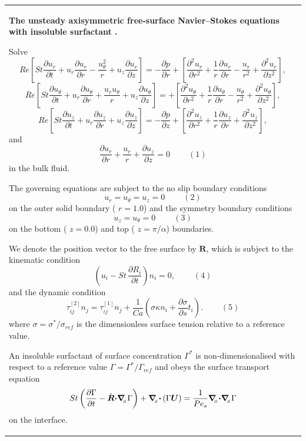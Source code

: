 \begin{center} \tabulinesep=1mm
\begin{longtabu} spread 0pt [c]{*{1}{|X[-1]}|}
\hline
\begin{center} {\bfseries  The unsteady axisymmetric free-\/surface Navier--Stokes equations with insoluble surfactant .} \end{center}  Solve \[ Re \left[ St \frac{\partial u_r}{\partial t} + u_r \frac{\partial u_r}{\partial r} - \frac{u_\theta^2}{r} + u_z \frac{\partial u_r}{\partial z} \right] = -\frac{\partial p}{\partial r} + \left[ \frac{\partial^2 u_r}{\partial r^2} + \frac{1}{r}\frac{\partial u_r}{\partial r} - \frac{u_r}{r^2} + \frac{\partial^2 u_r}{\partial z^2} \right], \] \[ Re \left[ St \frac{\partial u_\theta}{\partial t} + u_r \frac{\partial u_\theta}{\partial r} + \frac{u_r u_\theta}{r} + u_z \frac{\partial u_\theta}{\partial z} \right] = + \left[ \frac{\partial^2 u_\theta}{\partial r^2} + \frac{1}{r}\frac{\partial u_\theta}{\partial r} - \frac{u_\theta}{r^2} + \frac{\partial^2 u_\theta}{\partial z^2} \right], \] \[ Re \left[ St \frac{\partial u_z}{\partial t} + u_r \frac{\partial u_z}{\partial r} + u_z \frac{\partial u_z}{\partial z} \right] = -\frac{\partial p}{\partial z} + \left[ \frac{\partial^2 u_z}{\partial r^2} + \frac{1}{r}\frac{\partial u_z}{\partial r} + \frac{\partial^2 u_z}{\partial z^2} \right], \] and \[ \frac{\partial u_r}{\partial r} + \frac{u_r}{r} + \frac{\partial u_z}{\partial z} = 0 \ \ \ \ \ \ \ \ \ \ (1) \] in the bulk fluid.

The governing equations are subject to the no slip boundary conditions \[ u_r = u_\theta = u_z = 0 \ \ \ \ \ \ \ \ \ \ (2) \] on the outer solid boundary ( $ r = 1.0 $) and the symmetry boundary conditions \[ u_z = u_\theta = 0 \ \ \ \ \ \ \ \ \ \ (3) \] on the bottom ( $ z = 0.0 $) and top ( $ z = \pi / \alpha $) boundaries.

We denote the position vector to the free surface by $ \mathbf{R} $, which is subject to the kinematic condition \[ \left(u_i - St\, \frac{\partial R_i}{\partial t}\right) n_i = 0, \ \ \ \ \ \ \ \ \ \ (4) \] and the dynamic condition \[ \tau_{ij}^{[2]}n_j = \tau_{ij}^{[1]}n_j+\frac{1}{Ca}\left (\sigma \kappa n_i + \frac{\partial \sigma}{\partial s} t_{i} \right). \ \ \ \ \ \ \ \ \ \ (5) \] where $ \sigma = \sigma^{*} / \sigma_{ref} $ is the dimensionless surface tension relative to a reference value.

An insoluble surfactant of surface concentration $ \Gamma^{*}$ is non-\/dimensionalised with respect to a reference value $ \Gamma = \Gamma^{*}/\Gamma_{ref} $ and obeys the surface transport equation \[ St \left(\frac{\partial \Gamma}{\partial t} - \dot{\mbox{\boldmath$R$}} \mbox{\boldmath$\cdot$} \mbox{\boldmath$\nabla$}_{\!\!_{S}} \Gamma \right) + \mbox{\boldmath$\nabla$}_{\!\!_{S}} \mbox{\boldmath$\cdot$} \left(\Gamma \mbox{\boldmath$U$}\right) = \frac{1}{Pe_{s}} \mbox{\boldmath$\nabla$}_{\!\!_{S}}\mbox{\boldmath$\cdot$} \mbox{\boldmath$\nabla$}_{\!\!_{S}} \Gamma \] on the interface.


\end{longtabu}
\end{center}
